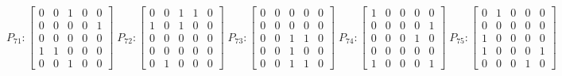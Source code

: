     $$
        P_{71} : \begin{bmatrix}
            0 & 0 & 1 & 0 & 0 \\
            0 & 0 & 0 & 0 & 1 \\
            0 & 0 & 0 & 0 & 0 \\
            1 & 1 & 0 & 0 & 0 \\
            0 & 0 & 1 & 0 & 0
        \end{bmatrix}
        \;
         P_{72} : \begin{bmatrix}
            0 & 0 & 1 & 1 & 0 \\
            1 & 0 & 1 & 0 & 0 \\
            0 & 0 & 0 & 0 & 0 \\
            0 & 0 & 0 & 0 & 0 \\
            0 & 1 & 0 & 0 & 0
        \end{bmatrix}
        \;
        P_{73} : \begin{bmatrix}
            0 & 0 & 0 & 0 & 0 \\
            0 & 0 & 0 & 0 & 0 \\
            0 & 0 & 1 & 1 & 0 \\
            0 & 0 & 1 & 0 & 0 \\
            0 & 0 & 1 & 1 & 0
        \end{bmatrix}
        \;
        P_{74} : \begin{bmatrix}
            1 & 0 & 0 & 0 & 0 \\
            0 & 0 & 0 & 0 & 1 \\
            0 & 0 & 0 & 1 & 0 \\
            0 & 0 & 0 & 0 & 0 \\
            1 & 0 & 0 & 0 & 1
        \end{bmatrix}
        \;
        P_{75} : \begin{bmatrix}
            0 & 1 & 0 & 0 & 0 \\
            0 & 0 & 0 & 0 & 0 \\
            1 & 0 & 0 & 0 & 0 \\
            1 & 0 & 0 & 0 & 1 \\
            0 & 0 & 0 & 1 & 0
        \end{bmatrix}
    $$

